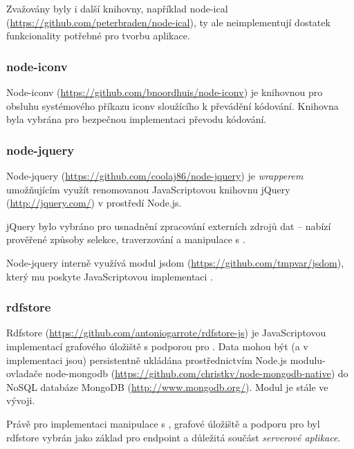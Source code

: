 Zvažovány byly i další knihovny, například node-ical (\url{https://github.com/peterbraden/node-ical}), ty ale neimplementují dostatek funkcionality potřebné pro tvorbu aplikace.

\subsubsection{node-iconv}
Node-iconv (\url{https://github.com/bnoordhuis/node-iconv}) je knihovnou pro obsluhu systémového příkazu iconv sloužícího k převádění kódování. Knihovna byla vybrána pro bezpečnou implementaci převodu kódování.

\subsubsection{node-jquery}
Node-jquery (\url{https://github.com/coolaj86/node-jquery}) je \textit{wrapperem} umožňujícím využít renomovanou JavaScriptovou knihovnu jQuery (\url{http://jquery.com/}) v prostředí Node.js.

jQuery bylo vybráno pro usnadnění zpracování externích zdrojů dat -- nabízí prověřené způsoby selekce, traverzování a manipulace s .

Node-jquery interně využívá modul jsdom (\url{https://github.com/tmpvar/jsdom}), který mu poskyte JavaScriptovou implementaci .

\subsubsection{rdfstore}
\label{sec:rdfstore}
Rdfstore (\url{https://github.com/antoniogarrote/rdfstore-js}) je JavaScriptovou implementací  grafového úložiště s podporou pro . Data mohou být (a v implementaci  jsou) persistentně ukládána prostřednictvím Node.js modulu-ovladače node-mongodb (\url{https://github.com/christkv/node-mongodb-native}) do NoSQL databáze MongoDB (\url{http://www.mongodb.org/}). Modul je stále ve vývoji.

Právě pro implementaci manipulace s , grafové úložiště a podporu pro  byl rdfstore vybrán jako základ pro  endpoint a důležitá součást \textit{serverové aplikace}.



